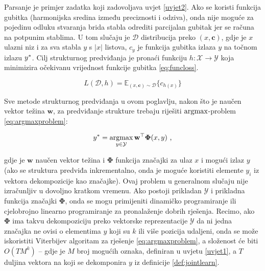 Parsanje je primjer zadatka koji zadovoljava uvjet \ref{uvjet2}. Ako se koristi
funkcija gubitka  (harmonijska sredina između preciznosti
i odziva), onda nije moguće za pojedinu odluku stvaranja brida stabla odrediti
parcijalan gubitak jer se  računa na potpunim stablima. U
tom slučaju je $\mathcal{D}$ distribucija preko $(x, \mathbf{c})$, gdje je $x$
ulazni niz i za sva stabla $y$ s $|x|$ listova, $c_y$ je funkcija gubitka
 izlaza $y$ na točnom izlazu $y\ssymbol{1}$. Cilj
strukturnog predviđanja je pronaći funkciju $h: \mathcal{X} \rightarrow
\mathcal{Y}$ koja minimizira očekivanu vrijednost funkcije gubitka
\ref{eq:funcloss}.

\begin{equation} \label{eq:funcloss}
  L(\mathcal{D}, h) = \mathbb{E}_{(x, \mathbf{c}) \sim \mathcal{D}} \{c_{h(x)}\}
\end{equation}

\noindent
Sve metode strukturnog predviđanja u ovom poglavlju, nakon što je naučen vektor
težina $\mathbf{w}$, za predviđanje strukture trebaju riješiti $\operatorname*{argmax}$-problem
\ref{eq:argmaxproblem}:

\begin{equation}\label{eq:argmaxproblem}
  y\ssymbol{1} = \argmax_{y \in \mathcal{Y}} \mathbf{w}^\top \mathbf{\Phi}(x, y) \text{ ,}
\end{equation}

\noindent
gdje je $\mathbf{w}$ naučen vektor težina i $\mathbf{\Phi}$ funkcija značajki za
ulaz $x$ i mogući izlaz $y$ (ako se struktura predviđa inkrementalno, onda je
moguće koristiti elemente $y_i$ iz vektora dekompozicije kao značajke). Ovaj
problem u generalnom slučaju nije izračunljiv u dovoljno kratkom vremenu. Ako
postoji prikladan $\mathcal{Y}$ i prikladna funkcija značajki $\mathbf{\Phi}$,
onda se mogu primijeniti dinamičko programiranje  ili
cjelobrojno linearno programiranje  za
pronalaženje dobrih rješenja. Recimo, ako $\mathbf{\Phi}$ ima takvu
dekompoziciju preko vektorske reprezentacije $\mathcal{Y}$ da ni jedna značajka
ne ovisi o elementima $y$ koji su $k$ ili više pozicija udaljeni, onda se može
iskoristiti Viterbijev algoritam za rješenje \ref{eq:argmaxproblem}, a složenost će
biti $O(T M^k)$ -- gdje je $M$ broj mogućih oznaka, definiran u uvjetu
\ref{uvjet1}, a $T$ duljina vektora na koji se dekomponira $y$ iz definicije
\ref{def:jointlearn}.
